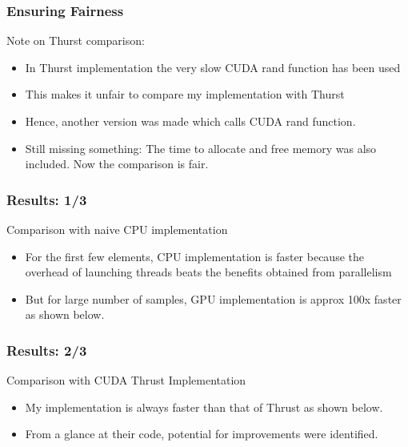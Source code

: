 \documentclass[mathserif]{beamer}
\begin{document}
\begin{frame}                                                                                                                                                                          
\frametitle{Ensuring Fairness}
Note on Thurst comparison:
\begin{itemize}
\item In Thurst implementation the very slow CUDA rand function has been used 
\item This makes it unfair to compare my implementation with Thurst 
\item Hence, another version was made which calls CUDA rand function.  
\item Still missing something: The time to allocate and free memory was also included. Now the comparison is fair.  
\end{itemize}
\end{frame}             
 

\begin{frame}                                                                                                                                                                          
\frametitle{Results: 1/3}
Comparison with naive CPU implementation
\begin{itemize}
\item For the first few elements, CPU implementation is faster because the overhead of launching threads beats the benefits obtained from parallelism 
\item But for large number of samples, GPU implementation is approx 100x faster as shown below.
\end{itemize}
\end{frame}             
 
\begin{frame}                                                                                                                                                                          
\frametitle{Results: 2/3}
Comparison with CUDA Thrust Implementation
\begin{itemize}
\item My implementation is always faster than that of Thrust as shown below. 
\item From a glance at their code, potential for improvements were identified.  
\end{itemize}
\end{frame}             
 
\end{document}

